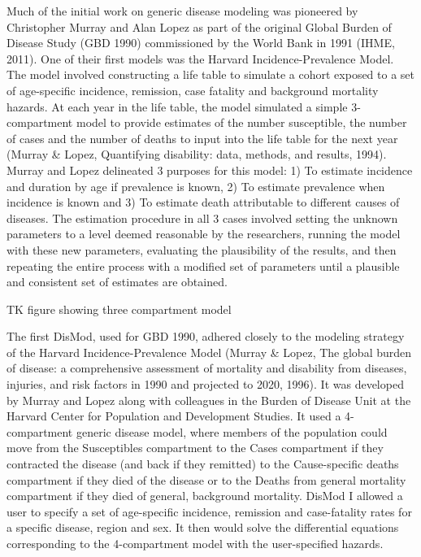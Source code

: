 Much of the initial work on generic disease modeling was pioneered by
Christopher Murray and Alan Lopez as part of the original Global
Burden of Disease Study (GBD 1990) commissioned by the World Bank in
1991 (IHME, 2011). One of their first models was the Harvard
Incidence-Prevalence Model. The model involved constructing a life
table to simulate a cohort exposed to a set of age-specific incidence,
remission, case fatality and background mortality hazards. At each
year in the life table, the model simulated a simple 3-compartment
model to provide estimates of the number susceptible, the number of
cases and the number of deaths to input into the life table for the
next year (Murray \& Lopez, Quantifying disability: data, methods, and
results, 1994). Murray and Lopez delineated 3 purposes for this model:
1) To estimate incidence and duration by age if prevalence is known,
2) To estimate prevalence when incidence is known and 3) To estimate
death attributable to different causes of diseases. The estimation
procedure in all 3 cases involved setting the unknown parameters to a
level deemed reasonable by the researchers, running the model with
these new parameters, evaluating the plausibility of the results, and
then repeating the entire process with a modified set of parameters
until a plausible and consistent set of estimates are obtained.

TK figure showing three compartment model

The first DisMod, used for GBD 1990, adhered closely to the modeling
strategy of the Harvard Incidence-Prevalence Model (Murray \& Lopez,
The global burden of disease: a comprehensive assessment of mortality
and disability from diseases, injuries, and risk factors in 1990 and
projected to 2020, 1996). It was developed by Murray and Lopez along
with colleagues in the Burden of Disease Unit at the Harvard Center
for Population and Development Studies. It used a 4-compartment
generic disease model, where members of the population could move
from the Susceptibles compartment to the Cases
compartment if they contracted the disease (and back if they remitted)
to the Cause-specific deaths compartment if they died of the
disease or to the Deaths from general mortality compartment if
they died of general, background mortality. DisMod I allowed a user to
specify a set of age-specific incidence, remission and case-fatality
rates for a specific disease, region and sex. It then would solve the
differential equations corresponding to the 4-compartment model with
the user-specified hazards.

